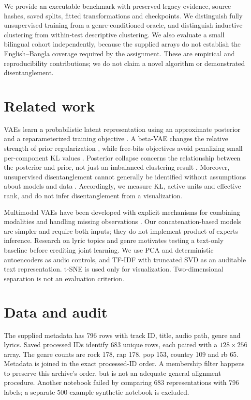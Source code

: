 \documentclass{article}
\begin{document}
We provide an executable benchmark with preserved legacy evidence, source hashes,
saved splits, fitted transformations and checkpoints. We distinguish fully
unsupervised training from a genre-conditioned oracle, and distinguish inductive
clustering from within-test descriptive clustering. We also evaluate a small
bilingual cohort independently, because the supplied arrays do not establish the
English--Bangla coverage required by the assignment. These are empirical and
reproducibility contributions; we do not claim a novel algorithm or demonstrated
disentanglement.

\section{Related work}
VAEs learn a probabilistic latent representation using an approximate posterior
and a reparameterized training objective \citep{kingma2014vae}. A beta-VAE changes
the relative strength of prior regularization \citep{higgins2017betavae}, while
free-bits objectives avoid penalizing small per-component KL values
\citep{kingma2016iaf}. Posterior collapse concerns the relationship between the
posterior and prior, not just an imbalanced clustering result
\citep{he2019lagging}. Moreover, unsupervised disentanglement cannot generally be
identified without assumptions about models and data \citep{locatello2019}.
Accordingly, we measure KL, active units and effective rank, and do not infer
disentanglement from a visualization.

Multimodal VAEs have been developed with explicit mechanisms for combining
modalities and handling missing observations \citep{wu2018mvae}. Our
concatenation-based models are simpler and require both inputs; they do not
implement product-of-experts inference. Research on lyric topics and genre
\citep{aljanaki2024} motivates testing a text-only baseline before crediting
joint learning. We use PCA and deterministic autoencoders as audio controls,
and TF-IDF with truncated SVD as an auditable text representation. t-SNE
\citep{vandermaaten2008tsne} is used only for visualization. Two-dimensional
separation is not an evaluation criterion.

\section{Data and audit}
\label{sec:data}
The supplied metadata has 796 rows with track ID, title, audio path, genre and
lyrics. Saved processed IDs identify 683 unique rows, each paired with a
$128\times256$ array. The genre counts are rock 178, rap 178, pop 153, country
109 and rb 65. Metadata is joined in the exact processed-ID order. A membership
filter happens to preserve this archive's order, but is not an adequate general
alignment procedure. Another notebook failed by comparing 683 representations
with 796 labels; a separate 500-example synthetic notebook is excluded.
\end{document}
